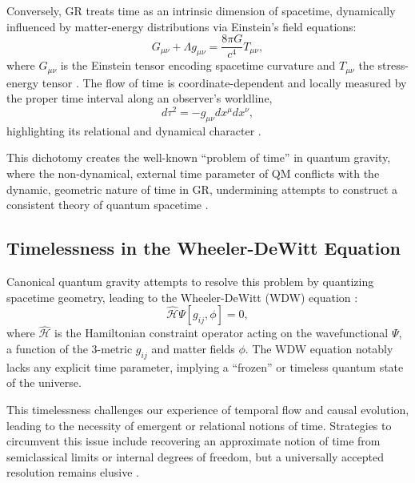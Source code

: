 \documentclass[12pt,a4paper]{article}
\numberwithin{equation}{section}
\begin{document}
Conversely, GR treats time as an intrinsic dimension of spacetime, dynamically influenced by matter-energy distributions via Einstein’s field equations:
\begin{equation}
G_{\mu\nu} + \Lambda g_{\mu\nu} = \frac{8\pi G}{c^4} T_{\mu\nu},
\label{eq:einstein}
\end{equation}
where \(G_{\mu\nu}\) is the Einstein tensor encoding spacetime curvature and \(T_{\mu\nu}\) the stress-energy tensor \cite{wald_general_1984}. The flow of time is coordinate-dependent and locally measured by the proper time interval along an observer’s worldline,
\begin{equation}
d\tau^2 = -g_{\mu\nu} dx^\mu dx^\nu,
\label{eq:proper_time}
\end{equation}
highlighting its relational and dynamical character \cite{misner_gravitation_1973}.

This dichotomy creates the well-known “problem of time” in quantum gravity, where the non-dynamical, external time parameter of QM conflicts with the dynamic, geometric nature of time in GR, undermining attempts to construct a consistent theory of quantum spacetime \cite{kuchar_time_1992}.

\subsection{Timelessness in the Wheeler-DeWitt Equation}

Canonical quantum gravity attempts to resolve this problem by quantizing spacetime geometry, leading to the Wheeler-DeWitt (WDW) equation \cite{dewitt_quantum_1967}:
\begin{equation}
\hat{\mathcal{H}} \Psi[g_{ij}, \phi] = 0,
\label{eq:wdw}
\end{equation}
where \( \hat{\mathcal{H}} \) is the Hamiltonian constraint operator acting on the wavefunctional \(\Psi\), a function of the 3-metric \(g_{ij}\) and matter fields \(\phi\). The WDW equation notably lacks any explicit time parameter, implying a “frozen” or timeless quantum state of the universe. 

This timelessness challenges our experience of temporal flow and causal evolution, leading to the necessity of emergent or relational notions of time. Strategies to circumvent this issue include recovering an approximate notion of time from semiclassical limits or internal degrees of freedom, but a universally accepted resolution remains elusive \cite{isham_problem_1993, rovelli_time_2004}.
\end{document}
